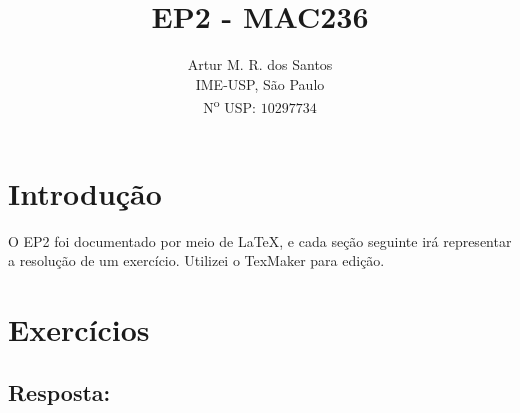 \documentclass[a4paper]{article}
\title{\textbf{EP2 - MAC236}}
\author{Artur M. R. dos Santos\\
IME-USP, São Paulo\\
N\textsuperscript{o} USP: $10297734$}
\date{}
\begin{document}
\maketitle

\section{Introdução}
O EP2 foi documentado por meio de {\LaTeX}, e cada seção seguinte irá representar a
resolução de um exercício. Utilizei o TexMaker para edição.

\section{Exercícios}

\subsection{Resposta:}
\end{document}
